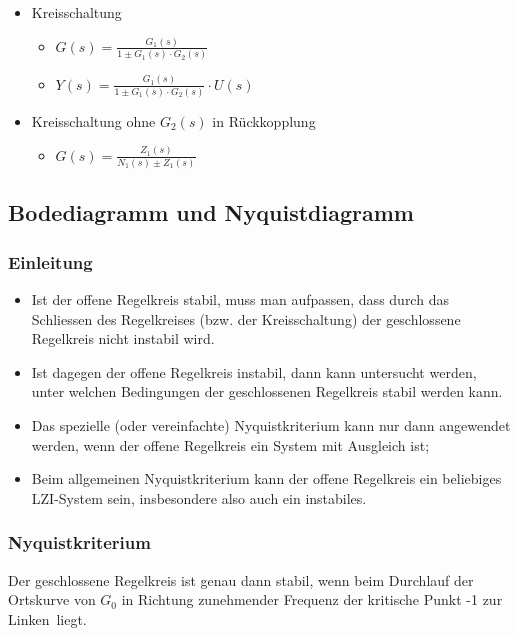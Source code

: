 \begin{multicols}{2}
\begin{itemize}
\item Kreisschaltung
\begin{itemize}
	\item $G(s) = \frac{G_1(s)}{1\pm G_1(s)\cdot G_2(s)}$
	\item $Y(s) = \frac{G_1(s)}{1\pm G_1(s)\cdot G_2(s)} \cdot U(s)$
\end{itemize}

\item Kreisschaltung ohne $G_2(s)$ in Rückkopplung
\begin{itemize}
	\item $G(s) = \frac{Z_1(s)}{N_1(s)\pm Z_1(s)}$
\end{itemize}

\end{itemize}
\end{multicols}


\subsection{Bodediagramm und Nyquistdiagramm}
\subsubsection{Einleitung}
\begin{itemize}
	\item Ist der offene Regelkreis stabil, muss man aufpassen, dass durch das Schliessen
	des Regelkreises (bzw. der Kreisschaltung) der geschlossene Regelkreis nicht instabil
	wird.
	\item Ist dagegen der offene Regelkreis instabil, dann kann untersucht werden, unter
	welchen Bedingungen der geschlossenen Regelkreis stabil werden kann.
	\item Das
	spezielle (oder vereinfachte) Nyquistkriterium kann nur dann angewendet werden,
	wenn der offene Regelkreis ein System mit Ausgleich ist;
	\item Beim allgemeinen Nyquistkriterium
	kann der offene Regelkreis ein beliebiges LZI-System sein, insbesondere also auch
	ein instabiles.
\end{itemize}
\subsubsection{Nyquistkriterium}
		Der geschlossene Regelkreis ist genau dann stabil, wenn beim Durchlauf der
		Ortskurve von $G_0$ in Richtung zunehmender Frequenz der kritische Punkt -1 \glqq zur
		Linken\grqq\ liegt.

